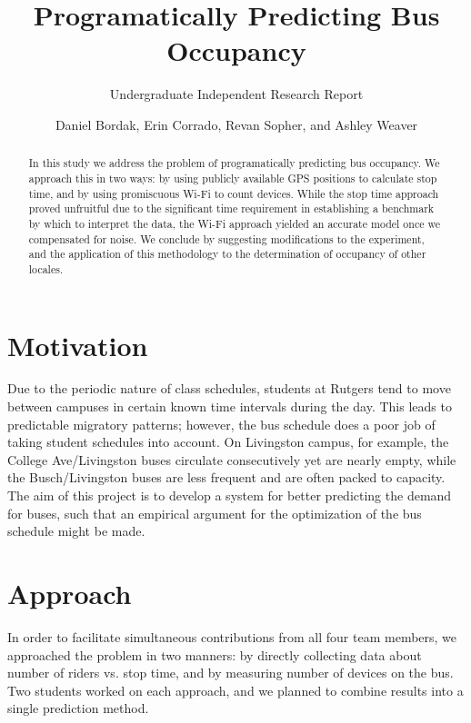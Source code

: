 \documentclass[letterpaper,abstract=on,titlepage=false]{scrreprt}
\begin{document}
\title{Programatically Predicting Bus Occupancy}
\subtitle{Undergraduate Independent Research Report}
\author{Daniel Bordak, Erin Corrado, Revan Sopher, and Ashley Weaver}

\maketitle

\begin{abstract}
In this study we address the problem of programatically predicting bus occupancy.
We approach this in two ways: by using publicly available GPS positions to calculate stop time, and by using promiscuous Wi-Fi to count devices.
While the stop time approach proved unfruitful due to the significant time requirement in establishing a benchmark by which to interpret the data, the Wi-Fi approach yielded an accurate model once we compensated for noise.
We conclude by suggesting modifications to the experiment, and the application of this methodology to the determination of occupancy of other locales.
\end{abstract}

\section*{Motivation}

Due to the periodic nature of class schedules, students at Rutgers tend to move between campuses in certain known time intervals during the day.
This leads to predictable migratory patterns; however, the bus schedule does a poor job of taking student schedules into account. 
On Livingston campus, for example, the College Ave/Livingston buses circulate consecutively yet are nearly empty, while the Busch/Livingston buses are less frequent and are often packed to capacity.
The aim of this project is to develop a system for better predicting the demand for buses, such that an empirical argument for the optimization of the bus schedule might be made.

\section*{Approach}

In order to facilitate simultaneous contributions from all four team members, we approached the problem in two manners: by directly collecting data about number of riders vs. stop time, and by measuring number of devices on the bus.
Two students worked on each approach, and we planned to combine results into a single prediction method.
\end{document}

